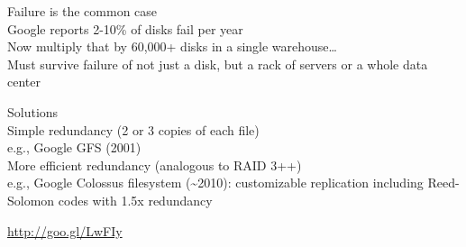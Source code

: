 Failure is the common case\\Google reports 2-10\% of disks fail per
year\\Now multiply that by 60,000+ disks in a single
warehouse\ldots{}\\Must survive failure of not just a disk, but a rack
of servers or a whole data center

Solutions\\Simple redundancy (2 or 3 copies of each file)\\e.g., Google
GFS (2001)\\More efficient redundancy (analogous to RAID 3++)\\e.g.,
Google Colossus filesystem (\textasciitilde{}2010): customizable
replication including Reed-Solomon codes with 1.5x redundancy

\url{http://goo.gl/LwFIy}
